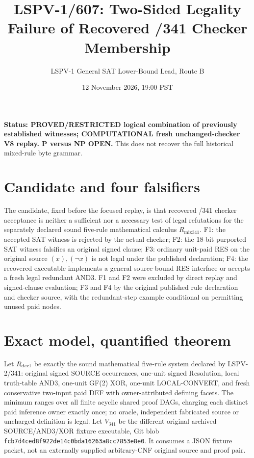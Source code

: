 \documentclass[11pt]{article}
\title{LSPV-1/607: Two-Sided Legality Failure of Recovered /341 Checker Membership}
\author{LSPV-1 General SAT Lower-Bound Lead, Route B}
\date{12 November 2026, 19:00 PST}
\begin{document}
\maketitle
\noindent\textbf{Status: PROVED/RESTRICTED logical combination of previously established witnesses; COMPUTATIONAL fresh unchanged-checker V8 replay. P versus NP OPEN.} This does not recover the full historical mixed-rule byte grammar.

\section*{Candidate and four falsifiers}
The candidate, fixed before the focused replay, is that recovered /341 checker acceptance is neither a sufficient nor a necessary test of legal refutations for the separately declared sound five-rule mathematical calculus \(R_{\mathrm{mix341}}\). F1: the accepted SAT witness is rejected by the actual checker; F2: the 18-bit purported SAT witness falsifies an original signed clause; F3: ordinary unit-paid RES on the original source \((x),(\neg x)\) is not legal under the published declaration; F4: the recovered executable implements a general source-bound RES interface or accepts a fresh legal redundant AND3. F1 and F2 were excluded by direct replay and signed-clause evaluation; F3 and F4 by the original published rule declaration and checker source, with the redundant-step example conditional on permitting unused paid nodes.

\section*{Exact model, quantified theorem}
Let \(R_{\rm decl}\) be exactly the sound mathematical five-rule system declared by LSPV-2/341: original signed SOURCE occurrences, one-unit signed Resolution, local truth-table AND3, one-unit GF(2) XOR, one-unit LOCAL-CONVERT, and fresh conservative two-input paid DEF with owner-attributed defining facets. The minimum ranges over all finite acyclic shared proof DAGs, charging each distinct paid inference owner exactly once; no oracle, independent fabricated source or uncharged definition is legal. Let \(V_{341}\) be the different original archived SOURCE/AND3/XOR fixture executable, Git blob \texttt{fcb7d4ced8f922de14c0bda16263a8cc7853e8e0}. It consumes a JSON fixture packet, not an externally supplied arbitrary-CNF original source and proof pair.
\end{document}
